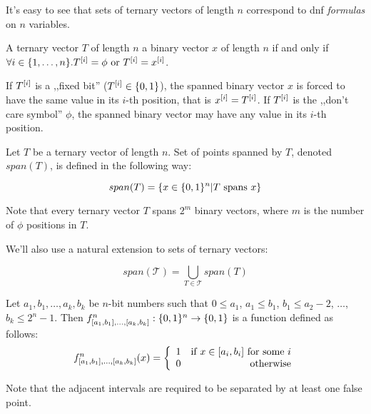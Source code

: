 It's easy to see that sets of ternary vectors of length $n$
correspond to \acrshort{dnf} \emph{formulas}
on $n$ variables.

\begin{definition}[Spanning]
A ternary vector $T$ of length $n$ 
a binary vector $x$ of length $n$
if and only if
$\forall i \in \{1, \ldots, n\} .
T^{[i]} = \phi \text{ or } T^{[i]} = x^{[i]}$.
\end{definition}

If $T^{[i]}$ is a ,,fixed bit''
($T^{[i]} \in \{0, 1\}$),
the spanned binary vector $x$
is forced to have the same value
in its $i$-th position,
that is $x^{[i]} = T^{[i]}$.
If $T^{[i]}$ is the ,,don't care symbol'' $\phi$,
the spanned binary vector
may have any value in its $i$-th position.

\begin{definition}
Let $T$ be a ternary vector of length $n$.
Set of points spanned by $T$,
denoted $span(T)$,
is defined in the following way:

\begin{equation*}
span(T) = \{
x \in \{0, 1\}^n |
T\text{ spans }x
\}
\end{equation*}
\end{definition}

Note that every ternary vector $T$
spans $2^m$ binary vectors,
where $m$ is the number of $\phi$ positions in $T$.

We'll also use a natural extension
to sets of ternary vectors:

\begin{equation*}
span(\mathcal{T}) =
\bigcup_{T \in \mathcal{T}} span(T)
\end{equation*}

\begin{definition}
\label{def:kibf}
Let $a_1, b_1, \ldots, a_k, b_k$ be $n$-bit numbers
such that $0 \leq a_1$,
$a_1 \leq b_1$,
$b_1 \leq a_2 - 2$,
$\ldots$,
$b_k \leq 2^n - 1$.
Then $f^n_{[a_1, b_1], \ldots, [a_k, b_k]}: \{0, 1\}{}^n \rightarrow \{0, 1\}{}$ is a function defined as follows:
\[f^n_{\interval{a_1}{b_1}, \ldots, \interval{a_k}{b_k}} (x) = \left\{
  \begin{array}{lr}
    1 & $if $ x \in \interval{a_i}{b_i}$ for some $i\\
    0 & $otherwise$
  \end{array}
\right.
\]
\end{definition}
Note that the adjacent intervals
are required to be separated by at least one false point.

